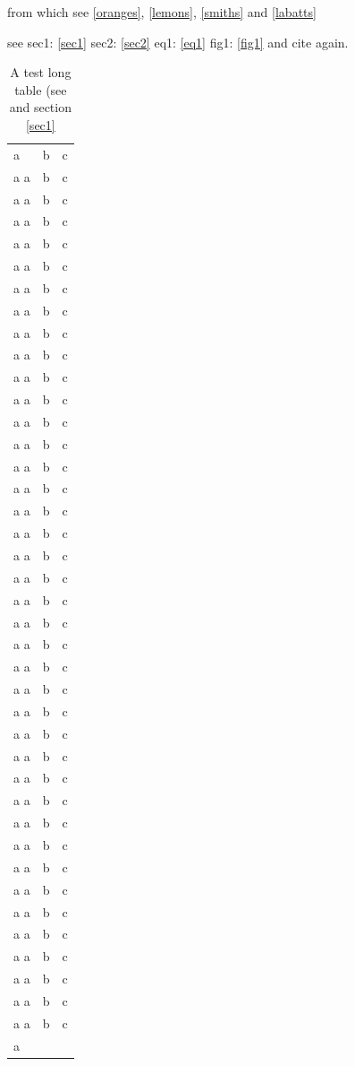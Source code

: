 \documentclass[11pt]{book}
\begin{document}
from which see \autoref{oranges}, \ref{lemons}, \ref{smiths} and
\autoref{labatts}


see
sec1: \autoref{sec1}
sec2: \autoref{sec2}
eq1: \autoref{eq1}
fig1: \autoref{fig1}
and cite \cite{Barcelo:1992:caa} again.
\onecolumn
\begin{longtable}{lll}
\caption{A test long table (see \protect\cite{Dallas:aia}
and section \protect\ref{sec1}}\label{mylongtab}\\
a & b & c \\a
a & b & c \\a
a & b & c \\a
a & b & c \\a
a & b & c \\a
a & b & c \\a
a & b & c \\a
a & b & c \\a
a & b & c \\a
a & b & c \\a
a & b & c \\a
a & b & c \\a
a & b & c \\a
a & b & c \\a
a & b & c \\a
a & b & c \\a
a & b & c \\a
a & b & c \\a
a & b & c \\a
a & b & c \\a
a & b & c \\a
a & b & c \\a
a & b & c \\a
a & b & c \\a
a & b & c \\a
a & b & c \\a
a & b & c \\a
a & b & c \\a
a & b & c \\a
a & b & c \\a
a & b & c \\a
a & b & c \\a
a & b & c \\a
a & b & c \\a
a & b & c \\a
a & b & c \\a
a & b & c \\a
a & b & c \\a
a & b & c \\a
a & b & c \\a

\end{longtable}
\end{document}
